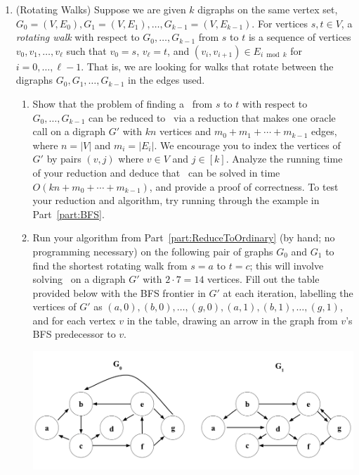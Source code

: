 \documentclass[11pt]{article}
\begin{document}
\begin{enumerate}
   \item  (Rotating Walks)  
    Suppose we are given $k$ digraphs on the same vertex set, $G_0=(V,E_0), G_1=(V,E_1), \ldots, G_{k-1}=(V,E_{k-1})$.  For vertices $s,t\in V$, a {\em rotating walk} with respect to $G_0,\ldots,G_{k-1}$ from $s$ to $t$ is a sequence of vertices $v_0,v_1,\ldots,v_{\ell}$ such that $v_0=s$, $v_\ell=t$, and $(v_i,v_{i+1})\in E_{i \bmod k}$ for $i=0,\ldots,\ell-1$.  That is, we are looking for walks that rotate between the digraphs $G_0,G_1,\ldots,G_{k-1}$ in the edges used.
    \begin{enumerate}
        \item Show that the problem of finding a \ShortestRotatingWalk\ from $s$ to $t$ with respect to $G_0,\ldots,G_{k-1}$ 
        can be reduced to \SingleSourceShortestPaths\ via a reduction that makes one oracle call on 
        a digraph $G'$ with $kn$ vertices and $m_0+m_1+\cdots+m_{k-1}$ edges, where $n=|V|$ and $m_i=|E_i|$.
        We encourage you to index the vertices of $G'$ by pairs $(v,j)$ where $v\in V$ and $j\in [k]$. 
        Analyze the running time of your reduction and deduce that \ShortestRotatingWalk\ can be solved in time $O(kn+m_0+\cdots+m_{k-1})$, and provide a proof of correctness.
        \label{part:ReduceToOrdinary}  To test your reduction and algorithm, try running through the example in Part~\ref{part:BFS}.


        

        
        


        \item \label{part:BFS} 
   
        Run your algorithm from Part~\ref{part:ReduceToOrdinary} (by hand; no programming necessary) on the following pair of graphs $G_0$ and $G_1$ to find the shortest rotating walk from $s=a$ to $t=c$; this will involve solving \SingleSourceShortestPaths\ on a digraph $G'$ with $2\cdot 7=14$ vertices. Fill out the table provided below with the BFS frontier in $G'$ at each iteration, labelling the vertices of $G'$ as $(a, 0),(b, 0),\ldots,(g,0),(a,1),(b,1),\ldots,(g,1)$, and for each vertex $v$ in the table, drawing an arrow in the graph from $v$'s BFS predecessor to $v$. 


            \includegraphics[width=14cm]{ps5_graph.png}


\end{enumerate}
\end{enumerate}
\end{document}
